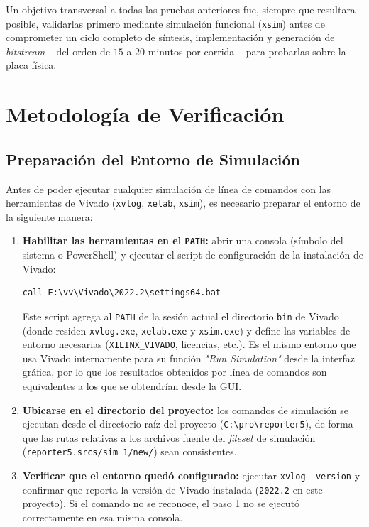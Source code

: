 Un objetivo transversal a todas las pruebas anteriores fue, siempre que
resultara posible, validarlas primero mediante simulación funcional
(\texttt{xsim}) antes de comprometer un ciclo completo de síntesis,
implementación y generación de \textit{bitstream} -- del orden de $15$ a
$20$ minutos por corrida -- para probarlas sobre la placa física.


\section{Metodología de Verificación}
\label{sec:metodologia_debug}

\subsection{Preparación del Entorno de Simulación}
\label{ssec:entorno_xsim}

Antes de poder ejecutar cualquier simulación de línea de comandos con las
herramientas de Vivado (\texttt{xvlog}, \texttt{xelab}, \texttt{xsim}), es
necesario preparar el entorno de la siguiente manera:

\begin{enumerate}
    \item \textbf{Habilitar las herramientas en el \texttt{PATH}:} abrir
    una consola (símbolo del sistema o PowerShell) y ejecutar el script de
    configuración de la instalación de Vivado:
    
\begin{lstlisting}[style=powershellstyle]
call E:\vv\Vivado\2022.2\settings64.bat
\end{lstlisting}

    Este script agrega al \texttt{PATH} de la sesión actual el directorio
    \texttt{bin} de Vivado (donde residen \texttt{xvlog.exe},
    \texttt{xelab.exe} y \texttt{xsim.exe}) y define las variables de
    entorno necesarias (\texttt{XILINX\_VIVADO}, licencias, etc.). Es el
    mismo entorno que usa Vivado internamente para su función
    \textit{"Run Simulation"} desde la interfaz gráfica, por lo que los
    resultados obtenidos por línea de comandos son equivalentes a los que
    se obtendrían desde la GUI.
    \item \textbf{Ubicarse en el directorio del proyecto:} los comandos de
    simulación se ejecutan desde el directorio raíz del proyecto
    (\texttt{C:\textbackslash pro\textbackslash reporter5}), de forma que
    las rutas relativas a los archivos fuente del \textit{fileset} de
    simulación (\texttt{reporter5.srcs/sim\_1/new/}) sean consistentes.
    \item \textbf{Verificar que el entorno quedó configurado:} ejecutar
    \texttt{xvlog -version} y confirmar que reporta la versión de Vivado
    instalada (\texttt{2022.2} en este proyecto). Si el comando no se
    reconoce, el paso 1 no se ejecutó correctamente en esa misma consola.
\end{enumerate}

